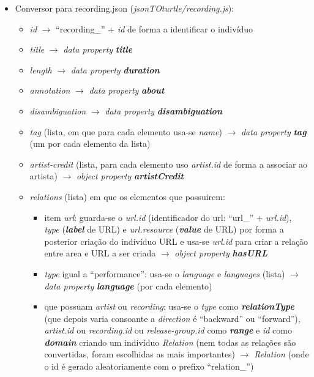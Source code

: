 \documentclass{article}
\begin{document}
\begin{itemize}
\begin{itemize}
\begin{itemize}
                \end{itemize}
        \end{itemize}
    \item Conversor para recording.json (\textit{jsonTOturtle/recording.js}):
        \begin{itemize}
            \item \textit{id} $\to$ ``recording\_'' + \textit{id} de forma a identificar o indivíduo
            \item \textit{title} $\to$ \textit{data property} \textit{\textbf{title}}
            \item \textit{length} $\to$ \textit{data property} \textit{\textbf{duration}}
            \item \textit{annotation} $\to$ \textit{data property} \textit{\textbf{about}}
            \item \textit{disambiguation} $\to$ \textit{data property} \textit{\textbf{disambiguation}}
            \item \textit{tag} (lista, em que para cada elemento usa-se \textit{name}) $\to$ \textit{data property} \textit{\textbf{tag}} (um por cada elemento da lista)
            \item \textit{artist-credit} (lista, para cada elemento uso \textit{artist.id} de forma a associar ao artista) $\to$ \textit{object property} \textit{\textbf{artistCredit}}
            \item \textit{relations} (lista) em que os elementos que possuirem:
                \begin{itemize}
                    \item item \textit{url}: guarda-se o \textit{url.id} (identificador do url: ``url\_'' + \textit{url.id}), \textit{type} (\textit{\textbf{label}} de URL) e \textit{url.resource} (\textit{\textbf{value}} de URL) por forma a posterior criação do indivíduo URL e usa-se \textit{url.id} para criar a relação entre area e URL a ser criada $\to$ \textit{object property} \textit{\textbf{hasURL}}
                    \item \textit{type} igual a ``performance'': usa-se o \textit{language} e \textit{languages} (lista) $\to$ \textit{data property} \textit{\textbf{language}} (por cada elemento)
                    \item que possuam \textit{artist} ou \textit{recording}: usa-se o \textit{type} como \textit{\textbf{relationType}} (que depois varia consoante a \textit{direction} é ``backward'' ou ``forward''), \textit{artist.id} ou \textit{recording.id} ou \textit{release-group.id} como \textit{\textbf{range}} e \textit{id} como \textit{\textbf{domain}} criando um indivíduo \textit{Relation} (nem todas as relações são convertidas, foram escolhidas as mais importantes) $\to$ \textit{Relation} (onde o id é gerado aleatoriamente com o prefixo ``relation\_'')

\end{itemize}
\end{itemize}
\end{itemize}
\end{document}
